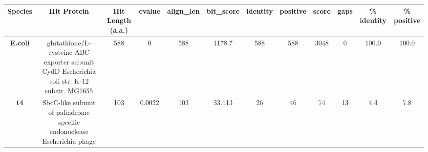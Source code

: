 \begin{tabular}{|c|c|c|c|c|c|c|c|c|c|c|c|} \hline
\textbf{Species} & \textbf{Hit Protein} & \textbf{Hit Length (a.a.)} & \textbf{evalue} & \textbf{align\_len} & \textbf{bit\_score} & \textbf{identity} & \textbf{positive} & \textbf{score} & \textbf{gaps} & \textbf{\% identity} & \textbf{\% positive} \\ \hline
\textbf{E.coli} & glutathione/L-cysteine ABC exporter subunit CydD Escherichia coli str. K-12 substr. MG1655 & 588 & 0 & 588 & 1178.7 & 588 & 588 & 3048 & 0 & 100.0 & 100.0\\
\textbf{t4} & SbcC-like subunit of palindrome specific endonuclease Escherichia phage  & 103 & 0.0022 & 103 & 33.113 & 26 & 46 & 74 & 13 & 4.4 & 7.8\\
\hline \end{tabular}

